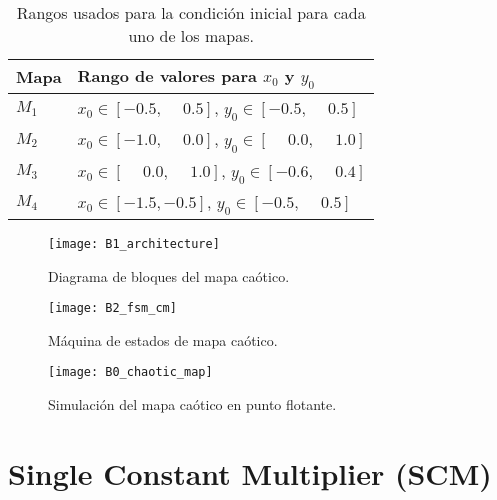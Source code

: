         \begin{table}[htbp]
            \centering
            \caption{Rangos usados para la condición inicial para cada uno de los mapas.}
            \begin{tabular}{|l|l|}
                \hline
                \rowcolor[rgb]{ .682,  .667,  .667}Mapa  & Rango de valores para $x_{0}$ y $y_{0}$ \\
                \hline
                $M_{1}$  & $x_{0} \in [-0.5, \phantom{-} 0.5]$, $y_{0} \in [-0.5, \phantom{-}0.5]$ \\
                \hline
                $M_{2}$  & $x_{0} \in [-1.0, \phantom{-} 0.0]$, $y_{0} \in [\phantom{-}0.0, \phantom{-}1.0]$ \\
                \hline
                $M_{3}$  & $x_{0} \in [\phantom{-}0.0, \phantom{-} 1.0]$, $y_{0} \in [-0.6, \phantom{-}0.4]$ \\
                \hline
                $M_{4}$  & $x_{0} \in [-1.5, -0.5]$, $y_{0} \in [-0.5, \phantom{-}0.5]$ \\
                \hline
            \end{tabular}
        \end{table}

        \begin{figure}[hbtp]
            \caption{Diagrama de bloques del mapa caótico.}
            \centering
            \texttt{[image: B1\_architecture]}
            \label{fig:B1_architecture}
        \end{figure}

        \begin{figure}[hbtp]
            \caption{Máquina de estados de mapa caótico.}
            \centering
            \texttt{[image: B2\_fsm\_cm]}
            \label{fig:B2_fsm_cm}
        \end{figure}

        \begin{figure}[hbtp]
            \caption{Simulación del mapa caótico en punto flotante.}
            \centering
            \texttt{[image: B0\_chaotic\_map]}
            \label{fig:B0_chaotic_map}
        \end{figure}

    \section{Single Constant Multiplier (SCM)}


